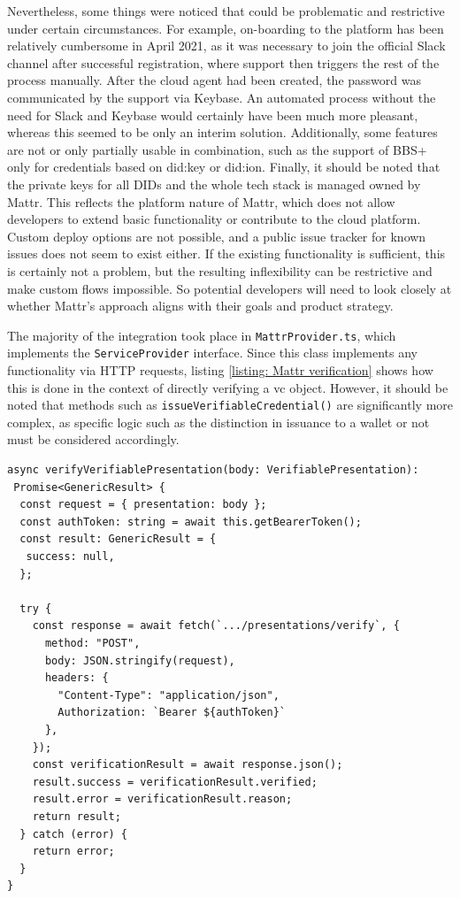         Nevertheless, some things were noticed that could be problematic and restrictive under certain circumstances. For example, on-boarding to the platform has been relatively cumbersome in April 2021, as it was necessary to join the official Slack channel after successful registration, where support then triggers the rest of the process manually. After the cloud agent had been created, the password was communicated by the support via Keybase. An automated process without the need for Slack and Keybase would certainly have been much more pleasant, whereas this seemed to be only an interim solution. Additionally, some features are not or only partially usable in combination, such as the support of BBS+ only for credentials based on did:key or did:ion. Finally, it should be noted that the private keys for all \acp{DID} and the whole tech stack is managed owned by Mattr. This reflects the platform nature of Mattr, which does not allow developers to extend basic functionality or contribute to the cloud platform. Custom deploy options are not possible, and a public issue tracker for known issues does not seem to exist either. If the existing functionality is sufficient, this is certainly not a problem, but the resulting inflexibility can be restrictive and make custom flows impossible. So potential developers will need to look closely at whether Mattr's approach aligns with their goals and product strategy.
    
        The majority of the integration took place in \texttt{MattrProvider.ts}, which implements the \texttt{ServiceProvider} interface. Since this class implements any functionality via HTTP requests, listing \ref{listing: Mattr verification} shows how this is done in the context of directly verifying a \ac{vc} object. However, it should be noted that methods such as \texttt{issueVerifiableCredential()} are significantly more complex, as specific logic such as the distinction in issuance to a wallet or not must be considered accordingly.
        \newline

\begin{lstlisting}[style=ES6, caption=Example of Mattr verification implementation, label={listing: Mattr verification}]
async verifyVerifiablePresentation(body: VerifiablePresentation): 
 Promise<GenericResult> {
  const request = { presentation: body };
  const authToken: string = await this.getBearerToken();
  const result: GenericResult = {
   success: null,
  };

  try {
    const response = await fetch(`.../presentations/verify`, {
      method: "POST",
      body: JSON.stringify(request),
      headers: { 
        "Content-Type": "application/json", 
        Authorization: `Bearer ${authToken}` 
      },
    });
    const verificationResult = await response.json();
    result.success = verificationResult.verified;
    result.error = verificationResult.reason;
    return result;
  } catch (error) {
    return error;
  }
}\end{lstlisting}
    
